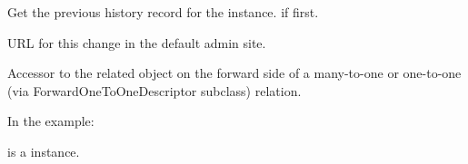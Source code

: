 \documentclass[letterpaper,10pt,english]{sphinxmanual}
\begin{document}
\begin{fulllineitems}

\begin{fulllineitems}
\label{\detokenize{modules/models:users.models.HistoricalProfile.prev_record}}
Get the previous history record for the instance.  if first.

\end{fulllineitems}


\begin{fulllineitems}
\label{\detokenize{modules/models:users.models.HistoricalProfile.revert_url}}
URL for this change in the default admin site.

\end{fulllineitems}


\begin{fulllineitems}
\label{\detokenize{modules/models:users.models.HistoricalProfile.school}}
Accessor to the related object on the forward side of a many-to-one or
one-to-one (via ForwardOneToOneDescriptor subclass) relation.

In the example:

\begin{sphinxVerbatim}[commandchars=\\\{\}]
 
       
\end{sphinxVerbatim}

 is a  instance.

\end{fulllineitems}



\end{fulllineitems}
\end{document}

